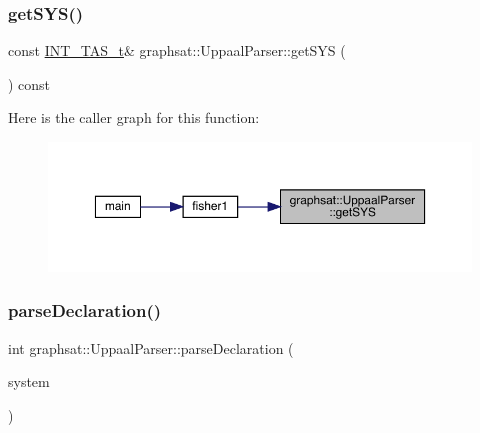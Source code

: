 \mbox{\label{classgraphsat_1_1_uppaal_parser_a30a317e52903660cc1d1715387e3bbe6}} 
\subsubsection{\texorpdfstring{getSYS()}{getSYS()}}
{\footnotesize\ttfamily const \mbox{\hyperlink{namespacegraphsat_a72468138834e9a7182f32fed8035a2de}{I\+N\+T\+\_\+\+T\+A\+S\+\_\+t}}\& graphsat\+::\+Uppaal\+Parser\+::get\+S\+YS (\begin{DoxyParamCaption}{ }\end{DoxyParamCaption}) const\hspace{0.3cm}{\ttfamily [inline]}}

Here is the caller graph for this function\+:
\nopagebreak
\begin{figure}[H]
\begin{center}
\leavevmode
\includegraphics[width=350pt]{classgraphsat_1_1_uppaal_parser_a30a317e52903660cc1d1715387e3bbe6_icgraph}
\end{center}
\end{figure}
\mbox{\label{classgraphsat_1_1_uppaal_parser_a5234eff5f12d53358893072e421fb108}} 
\subsubsection{\texorpdfstring{parseDeclaration()}{parseDeclaration()}}
{\footnotesize\ttfamily int graphsat\+::\+Uppaal\+Parser\+::parse\+Declaration (\begin{DoxyParamCaption}\item[{\mbox{\hyperlink{namespacegraphsat_a94de7ec8ce4b5d6bc48bdc19e58b2d76}{X\+M\+L\+\_\+P}}}]{system }\end{DoxyParamCaption})\hspace{0.3cm}{\ttfamily [private]}}

